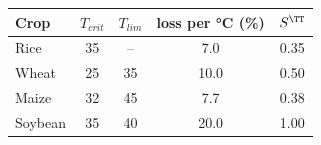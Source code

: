 \begin{tabular}{lcccc}
\toprule
Crop & $T_{crit}$ & $T_{lim}$ & loss per \si{\celsius} (\%) & $S^{\TT}$\\
\midrule
Rice & 35 & -- & 7.0 & 0.35 \\
Wheat & 25 & 35 & 10.0 & 0.50 \\
Maize & 32 & 45 & 7.7 & 0.38 \\
Soybean & 35 & 40 & 20.0 & 1.00 \\
\bottomrule
\end{tabular}
